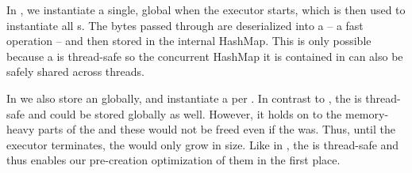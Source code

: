 \begin{description}[style=multiline, leftmargin=2.5cm, font=\bfseries]

    \item[Wasmtime] In , we instantiate a single, global  when the executor starts, which is then used to instantiate all s. The bytes passed through  are deserialized into a  -- a fast operation -- and then stored in the internal HashMap. This is only possible because a  is thread-safe so the concurrent HashMap it is contained in can also be safely shared across threads.

    \item[Wasmer] In  we also store an  globally, and instantiate a  per . In contrast to , the  is thread-safe and could be stored globally as well. However, it holds on to the memory-heavy parts of the  and these would not be freed even if the  was. Thus, until the executor terminates, the  would only grow in size. Like in , the  is thread-safe and thus enables our pre-creation optimization of them in the first place.


\end{description}
